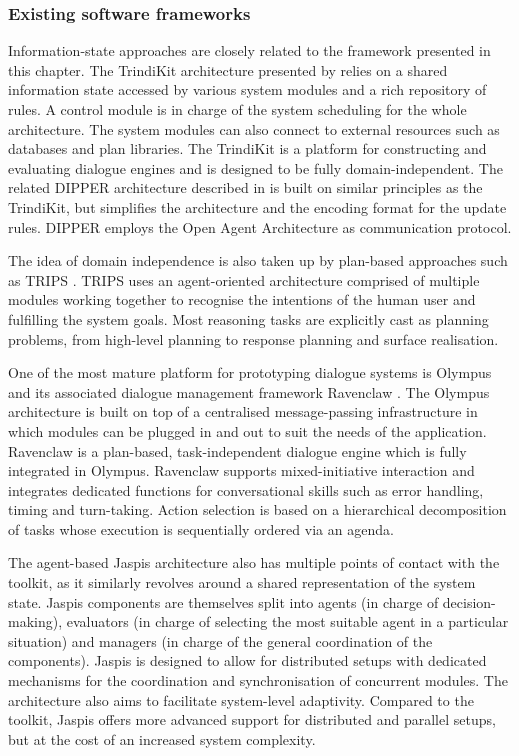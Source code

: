 \subsubsection*{Existing software frameworks}

Information-state approaches are closely related to the framework presented in this chapter. The TrindiKit architecture presented by \cite{Larsson:2000} relies on a shared information state accessed by various system modules and a rich repository of rules. A control module is in charge of the system scheduling for the whole architecture. The system modules can also connect to external resources such as databases and plan libraries.   The TrindiKit is a platform for constructing and evaluating dialogue engines and is designed to be fully domain-independent. The related DIPPER architecture described in \citep{Bos2003} is built on similar principles as the TrindiKit, but simplifies the architecture and the encoding format for the  update rules.  DIPPER employs the Open Agent Architecture as communication protocol.

The idea of domain independence is also taken up by plan-based approaches such as TRIPS \citep[The Rochester Interactive Planning System, cf. ][]{Allen:2000:AGD:973935.973937}. TRIPS uses an agent-oriented architecture comprised of multiple modules working together to recognise the intentions of the human user and fulfilling the system goals.  Most reasoning tasks are explicitly cast as planning problems, from high-level planning to response planning and surface realisation.  

One of the most mature platform for prototyping dialogue systems is Olympus and its associated dialogue management framework Ravenclaw \citep{Bohus:2007,Bohus:2009}.  The Olympus architecture is built on top of a centralised message-passing infrastructure in which modules can be plugged in and out to suit the needs of the application.  Ravenclaw is a plan-based, task-independent dialogue engine which is fully integrated in Olympus.  Ravenclaw supports mixed-initiative interaction and integrates dedicated functions for conversational skills such as error handling, timing and turn-taking. Action selection is based on a hierarchical decomposition of tasks whose execution is sequentially ordered via an agenda. 

The agent-based Jaspis architecture \citep{jaspis2004} also has multiple points of contact with the \opendial toolkit, as it similarly revolves around a shared representation of the system state.  Jaspis components are themselves split into agents (in charge of decision-making), evaluators (in charge of selecting the most suitable agent in a particular situation) and managers (in charge of the general coordination of the components). Jaspis is designed to allow for distributed setups with dedicated mechanisms for the coordination and synchronisation of concurrent modules.  The architecture also aims to facilitate system-level adaptivity.  Compared to the \opendial toolkit, Jaspis offers more advanced support for distributed and parallel setups, but at the cost of an increased system complexity.  

